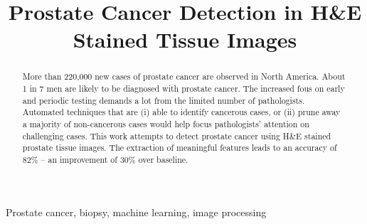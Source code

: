 \documentclass{article}
\title{Prostate Cancer Detection in H\&E Stained Tissue Images}
\begin{document}
%
\maketitle
%
\begin{abstract}
More than 220,000 new cases of prostate cancer are observed in North America. About 1 in 7 men are likely to be diagnosed with prostate cancer. The increased fous on early and periodic testing demands a lot from the limited number of pathologists. Automated techniques that are (i) able to identify cancerous cases, or (ii) prune away a majority of non-cancerous cases would help focus pathologists' attention on challenging cases. This work attempts to detect prostate cancer using H\&E stained prostate tissue images. The extraction of meaningful features leads to an accuracy of 82\% -- an improvement of 30\% over baseline.
\end{abstract}
%
\begin{keywords}
Prostate cancer, biopsy, machine learning, image processing
\end{keywords}
%














\end{document}
